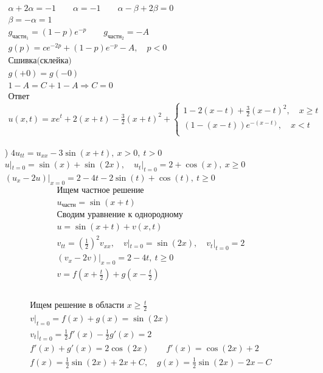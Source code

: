 \begin{enumerate}
\begin{gather*}
  \alpha +2\alpha = -1 \qquad \alpha = -1 \qquad \alpha - \beta +2 \beta = 0 \\
  \beta = -\alpha = 1 \\
  g_{\text{частн}_{1}} = (1-p)e^{-p} \qquad g_{\text{частн}_{2}}=-A \\
  g(p) = ce^{-2p}+(1-p)e^{-p}-A, \quad p < 0 \\
  \text{Сшивка(склейка)} \\
  g(+0)= g(-0) \\
  1-A=C+1-A \Rightarrow C = 0 \\
  \text{Ответ} \\
  \boxed{u(x,t)=xe^{t}+2(x+t)- \frac{3}{2}(x+t)^{2} +
  \begin{cases}
   1-2(x-t) + \frac{3}{2}(x-t)^{2}, \quad x \geq t \\
   (1-(x-t))e^{-(x-t)}, \quad x <t \\
\end{cases}}
\end{gather*}
\item[\text{в})] $4u_{tt}=u_{xx}-3\sin(x+t), \ x >0, \ t>0$ \\
  $u|_{t=0}=\sin(x)+\sin(2x),\quad u_{t}|_{t=0}=2+\cos(x), \ x \geq 0$ \\
  $(u_{x}-2u)|_{x=0}=2-4t-2\sin(t)+\cos(t), \ t \geq 0$ \\
  \begin{gather*}
    \text{Ищем частное решение} \\
    u_{\text{частн}} = \sin(x+t) \\
    \text{Сводим уравнение к однородному} \\
    u = \sin(x+t)+v(x,t) \\
    v_{tt}=\left(\frac{1}{2}\right)^{2}v_{xx}, \quad v|_{t=0}=\sin(2x), \quad v_{t}|_{t=0}=2 \\
    (v_{x}-2v)|_{x=0}=2-4t, \ t \geq 0 \\
    v = f(x+ \frac{t}{2})+g(x - \frac{t}{2}) \\
    \end{gather*} \\
    \begin{gather*}
    \text{Ищем решение в области $x \geq \frac{t}{2}$} \\
    v|_{t=0}=f(x)+g(x)=\sin(2x) \\
    v_{t}|_{t=0}= \frac{1}{2}f'(x)- \frac{1}{2}g'(x)=2 \\
    f'(x)+g'(x)=2\cos(2x) \qquad f'(x)=\cos(2x)+2 \\
    \boxed{f(x)= \frac{1}{2}\sin(2x)+2x+C,\quad g(x)= \frac{1}{2}\sin(2x)-2x-C} \\

\end{gather*}
\end{enumerate}

